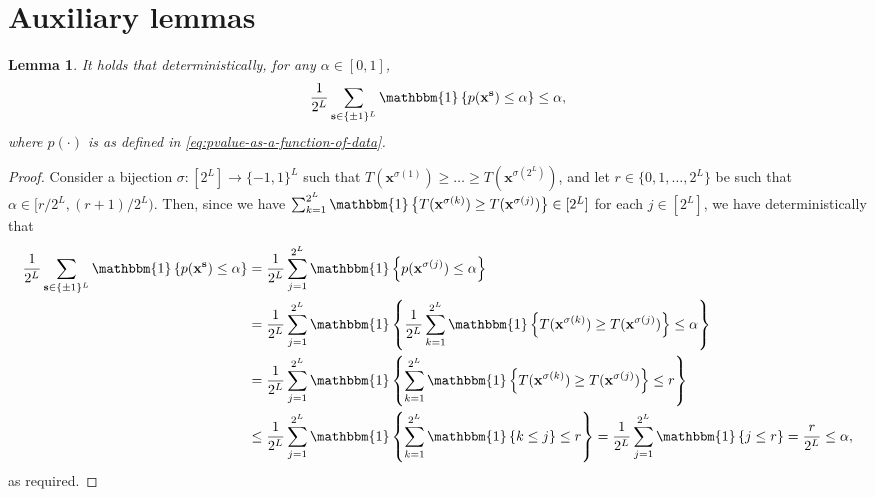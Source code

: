 \documentclass[12pt]{article}
\newtheorem{lemma}[theorem]{Lemma}
\newcommand{\One}[1]{{\mathbbm{1}}\left\{{#1}\right\}}
\newcommand{\bs}{\mathbf{s}}
\newcommand{\bx}{\mathbf{x}}
\begin{document}
\section{Auxiliary lemmas}\label{app:lemmas}
\begin{lemma}\label{lem:deterministic_control_on_perm_pvalue}
    It holds that deterministically, for any $\alpha\in [0,1]$,
    \[
    \frac{1}{2^L}\sum_{\bs\in\{\pm 1\}^L} \One{p(\bx^{\bs}) \leq \alpha}\leq \alpha,
    \]
    where $p(\cdot)$ is as defined in \eqref{eq:pvalue-as-a-function-of-data}.
\end{lemma}
\begin{proof}
    Consider a bijection $\sigma:[2^L] \rightarrow \{-1,1\}^L$ such that $T(\bx^{\sigma(1)}) \geq \ldots \geq T(\bx^{\sigma(2^L)})$, and let $r \in \{0,1,\ldots,2^L\}$ be such that $\alpha \in \bigl[r/2^L,(r+1)/2^L\bigr)$.  Then, since we have $\sum_{k=1}^{2^L} \One{T(\bx^{\sigma(k)}) \geq T(\bx^{\sigma(j)})} \in [2^L]$  for each $j \in [2^L]$, we have deterministically that
    \begin{align*}
    \frac{1}{2^L}\sum_{\bs\in\{\pm 1\}^L} \One{p(\bx^{\bs}) \leq \alpha} 
    &=\frac{1}{2^L}\sum_{j=1}^{2^L}\One{p(\bx^{\sigma(j)})\leq \alpha}\\
    &= \frac{1}{2^L}\sum_{j=1}^{2^L} \One{\frac{1}{2^L}\sum_{k=1}^{2^L} \One{T(\bx^{\sigma(k)}) \geq T(\bx^{\sigma(j)})} \leq \alpha} \nonumber \\
    &= \frac{1}{2^L}\sum_{j=1}^{2^L} \One{\sum_{k=1}^{2^L} \One{T(\bx^{\sigma(k)}) \geq T(\bx^{\sigma(j)})} \leq r} \nonumber \\
    &\leq \frac{1}{2^L}\sum_{j=1}^{2^L} \One{\sum_{k=1}^{2^L} \One{k \leq j} \leq r} = \frac{1}{2^L}\sum_{j=1}^{2^L} \One{j \leq r} = \frac{r}{2^L} \leq \alpha,
    \end{align*}
as required.
\end{proof}
\end{document}

